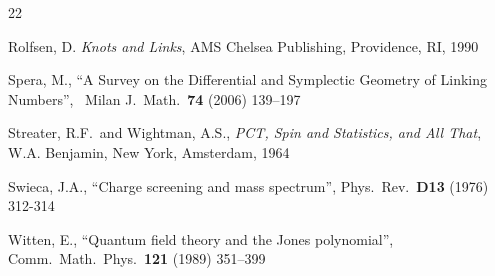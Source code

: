 \documentclass[11pt]{article}
\numberwithin{equation}{section}
\begin{document}
\begin{thebibliography}{22}
{ 
Rolfsen, D. {\it Knots and Links},  
AMS Chelsea Publishing, Providence, RI, 1990 

 Spera, M.,
``A Survey on the Differential and Symplectic Geometry of Linking Numbers'', \ 
Milan J.\ Math.\ {\bf 74} (2006) 139--197

  Streater, R.F.\ and Wightman, A.S., 
{\it PCT, Spin and Statistics, and All That},
W.A. Benjamin, New York, Amsterdam, 1964



 Swieca, J.A.,
``Charge  screening  and  mass  spectrum'',  
Phys.\  Rev.\ {\bf D13} (1976) 312-314

 Witten, E.,
``Quantum field theory and the Jones polynomial'',
Comm.\ Math.\ Phys.\ {\bf 121} (1989) 351--399

}
\end{thebibliography}
\end{document}
